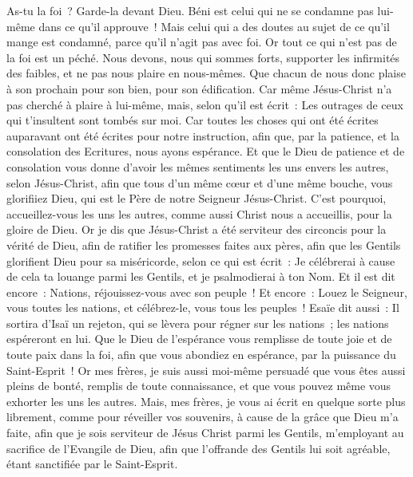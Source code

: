 \begin{multicols}{2}
As-tu la foi~? Garde-la devant Dieu. Béni est celui qui ne se condamne pas lui-même dans ce qu'il approuve~!
Mais celui qui a des doutes au sujet de ce qu'il mange est condamné, parce qu'il n'agit pas avec foi. Or tout ce qui n'est pas de la foi est un péché.
\VerseOne{}Nous devons, nous qui sommes forts, supporter les infirmités des faibles, et ne pas nous plaire en nous-mêmes.
Que chacun de nous donc plaise à son prochain pour son bien, pour son édification.
Car même Jésus-Christ n'a pas cherché à plaire à lui-même, mais, selon qu'il est écrit~: Les outrages de ceux qui t'insultent sont tombés sur moi.
Car toutes les choses qui ont été écrites auparavant ont été écrites pour notre instruction, afin que, par la patience, et la consolation des Ecritures, nous ayons espérance.
Et que le Dieu de patience et de consolation vous donne d'avoir les mêmes sentiments les uns envers les autres, selon Jésus-Christ,
afin que tous d'un même cœur et d'une même bouche, vous glorifiiez Dieu, qui est le Père de notre Seigneur Jésus-Christ.
C'est pourquoi, accueillez-vous les uns les autres, comme aussi Christ nous a accueillis, pour la gloire de Dieu.
Or je dis que Jésus-Christ a été serviteur des circoncis pour la vérité de Dieu, afin de ratifier les promesses faites aux pères,
afin que les Gentils glorifient Dieu pour sa miséricorde, selon ce qui est écrit~: Je célébrerai à cause de cela ta louange parmi les Gentils, et je psalmodierai à ton Nom. Et il est dit encore~:
Nations, réjouissez-vous avec son peuple~!
Et encore~: Louez le Seigneur, vous toutes les nations, et célébrez-le, vous tous les peuples~! Esaïe dit aussi~:
Il sortira d'Isaï un rejeton, qui se lèvera pour régner sur les nations~; les nations espéreront en lui.
Que le Dieu de l'espérance vous remplisse de toute joie et de toute paix dans la foi, afin que vous abondiez en espérance, par la puissance du Saint-Esprit~!
 Or mes frères, je suis aussi moi-même persuadé que vous êtes aussi pleins de bonté, remplis de toute connaissance, et que vous pouvez même vous exhorter les uns les autres.
Mais, mes frères, je vous ai écrit en quelque sorte plus librement, comme pour réveiller vos souvenirs, à cause de la grâce que Dieu m'a faite,
afin que je sois serviteur de Jésus Christ parmi les Gentils, m'employant au sacrifice de l'Evangile de Dieu, afin que l'offrande des Gentils lui soit agréable, étant sanctifiée par le Saint-Esprit.

\end{multicols}
